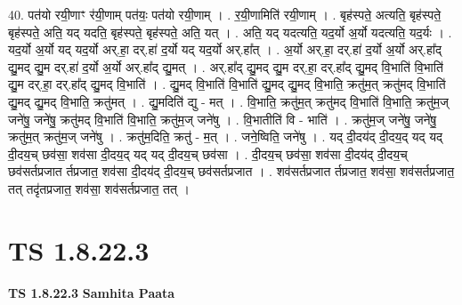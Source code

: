 \documentclass[17pt]{extarticle}
\begin{document}
40. पत॑यो रयी॒णाꣳ र॑यी॒णाम् पत॑यः॒ पत॑यो रयी॒णाम् । . र॒यी॒णामिति॑ रयी॒णाम् । . बृह॑स्पते॒ अत्यति॒ बृह॑स्पते॒ बृह॑स्पते॒ अति॒ यद् यदति॒ बृह॑स्पते॒ बृह॑स्पते॒ अति॒ यत् । . अति॒ यद् यदत्यति॒ यद॒र्यो अ॒र्यो यदत्यति॒ यद॒र्यः । . यद॒र्यो अ॒र्यो यद् यद॒र्यो अर्.हा॒ दर्.हा॑ द॒र्यो यद् यद॒र्यो अर्.हा᳚त् । . अ॒र्यो अर्.हा॒ दर्.हा॑ द॒र्यो अ॒र्यो अर्.हा᳚द् द्यु॒मद् द्यु॒म दर्.हा॑ द॒र्यो अ॒र्यो अर्.हा᳚द् द्यु॒मत् । . अर्.हा᳚द् द्यु॒मद् द्यु॒म दर्.हा॒ दर्.हा᳚द् द्यु॒मद् वि॒भाति॑ वि॒भाति॑ द्यु॒म दर्.हा॒ दर्.हा᳚द् द्यु॒मद् वि॒भाति॑ । . द्यु॒मद् वि॒भाति॑ वि॒भाति॑ द्यु॒मद् द्यु॒मद् वि॒भाति॒ क्रतु॑म॒त् क्रतु॑मद् वि॒भाति॑ द्यु॒मद् द्यु॒मद् वि॒भाति॒ क्रतु॑मत् । . द्यु॒मदिति॑ द्यु - मत् । . वि॒भाति॒ क्रतु॑म॒त् क्रतु॑मद् वि॒भाति॑ वि॒भाति॒ क्रतु॑म॒ज् जने॑षु॒ जने॑षु॒ क्रतु॑मद् वि॒भाति॑ वि॒भाति॒ क्रतु॑म॒ज् जने॑षु । . वि॒भातीति॑ वि - भाति॑ । . क्रतु॑म॒ज् जने॑षु॒ जने॑षु॒ क्रतु॑म॒त् क्रतु॑म॒ज् जने॑षु । . क्रतु॑म॒दिति॒ क्रतु॑ - म॒त् । . जने॒ष्विति॒ जने॑षु । . यद् दी॒दय॑द् दी॒दय॒द् यद् यद् दी॒दय॒च् छव॑सा॒ शव॑सा दी॒दय॒द् यद् यद् दी॒दय॒च् छव॑सा । . दी॒दय॒च् छव॑सा॒ शव॑सा दी॒दय॑द् दी॒दय॒च् छव॑सर्तप्रजात र्तप्रजात॒ शव॑सा दी॒दय॑द् दी॒दय॒च् छव॑सर्तप्रजात । . शव॑सर्तप्रजात र्तप्रजात॒ शव॑सा॒ शव॑सर्तप्रजात॒ तत् तदृ॑तप्रजात॒ शव॑सा॒ शव॑सर्तप्रजात॒ तत् । \newline
\pagebreak
{}
\section*{ TS 1.8.22.3 }

\textbf{TS 1.8.22.3 } \newline
\textbf{Samhita Paata} \newline
\end{document}
